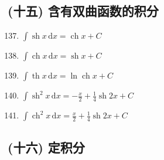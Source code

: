 \subsection*{(十五) 含有双曲函数的积分}

\begin{enumerate}
    \setcounter{enumi}{136}
    \item $\displaystyle \int \operatorname{sh} x \, \mathrm{d}x = \operatorname{ch} x + C$
    \item $\displaystyle \int \operatorname{ch} x \, \mathrm{d}x = \operatorname{sh} x + C$
    \item $\displaystyle \int \operatorname{th} x \, \mathrm{d}x = \ln \operatorname{ch} x + C$
    \item $\displaystyle \int \operatorname{sh}^2 x \, \mathrm{d}x = -\frac{x}{2} + \frac{1}{4} \operatorname{sh} 2x + C$
    \item $\displaystyle \int \operatorname{ch}^2 x \, \mathrm{d}x = \frac{x}{2} + \frac{1}{4} \operatorname{sh} 2x + C$
\end{enumerate}

\subsection*{(十六) 定积分}

